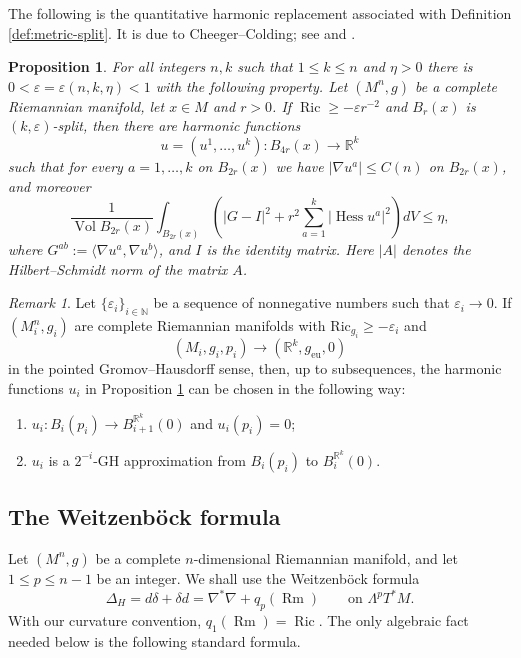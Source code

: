 \documentclass[11pt]{amsart}
\newtheorem{proposition}[theorem]{Proposition}
\theoremstyle{definition}
\theoremstyle{remark}
\newtheorem{remark}[theorem]{Remark}
\DeclareMathOperator{\Ric}{Ric}
\DeclareMathOperator{\Hess}{Hess}
\DeclareMathOperator{\Vol}{Vol}
\newcommand{\R}{\mathbb R}
\newcommand{\eps}{\varepsilon}
\newcommand{\Rm}{\operatorname{Rm}}
\begin{document}
The following is the quantitative harmonic replacement associated with
Definition \ref{def:metric-split}. It is due to Cheeger--Colding; see
\cite{CheegerColdingWarped,CheegerColdingI} and
\cite[Lemma~1.21(2)]{CheegerNaber}.

\begin{proposition}\label{prop:harmonic-replacement}
For all integers $n,k$ such that $1\leq k\leq n$ and $\eta>0$ there is
$0<\eps=\eps(n,k,\eta)<1$ with the following property. Let $(M^n,g)$ be a complete Riemannian manifold, let $x\in M$ and $r>0$. If
$\Ric\geq -\varepsilon r^{-2}$ and $B_r(x)$ is $(k,\eps)$-split, then there are harmonic
functions
\[
           u=(u^1,\ldots,u^k):B_{4r}(x)\longrightarrow\R^k
\]
such that for every $a=1,\ldots,k$ on $B_{2r}(x)$ we have $ |\nabla u^a|\leq C(n)$ on $B_{2r}(x)$, and moreover
\begin{equation}\label{eq:harmonic-bounds}
 \frac{1}{\Vol B_{2r}(x)}\int_{B_{2r}(x)}
 \left(|G-I|^2+r^2\sum_{a=1}^k|\Hess u^a|^2\right)dV\leq\eta,
\end{equation}
where $G^{ab}:=\langle \nabla u^a,\nabla u^b\rangle$, and $I$ is the identity matrix. Here $|A|$ denotes the Hilbert--Schmidt norm of the matrix $A$.
\end{proposition}

\begin{remark}\label{rem:GHisometry}
Let $\{\varepsilon_i\}_{i\in\mathbb N}$ be a sequence of nonnegative numbers such that $\varepsilon_i\to 0$. If $(M^n_i,g_i)$ are complete Riemannian manifolds with $\mathrm{Ric}_{g_i}\geq -\varepsilon_i$ and
\[
 (M_i,g_i,p_i)\longrightarrow(\mathbb R^k,g_{\mathrm{eu}},0)
\]
in the pointed Gromov--Hausdorff sense, then, up to subsequences, the harmonic functions
$u_i$ in Proposition \ref{prop:harmonic-replacement} can be chosen in the following way:
\begin{enumerate}
    \item $u_i:B_i(p_i)\to B_{i+1}^{\mathbb R^k}(0)$ and $u_i(p_i)=0$;
    \item $u_i$ is a $2^{-i}$-GH approximation from $B_i(p_i)$ to $B_i^{\mathbb R^k}(0)$.
\end{enumerate}  
\end{remark}

\subsection{The Weitzenb\"ock formula}

Let $(M^n,g)$ be a complete $n$-dimensional Riemannian manifold, and let $1\leq p\leq n-1$ be an integer. We shall use the Weitzenb\"ock formula
\begin{equation}\label{eq:weitzenbock}
       \Delta_H=d\delta+\delta d=\nabla^*\nabla+q_p(\Rm)
       \qquad\text{on }\Lambda^pT^*M.
\end{equation}
With our curvature convention,
$q_1(\Rm)=\Ric$.  The only algebraic
fact needed below is the following standard formula.
\end{document}
